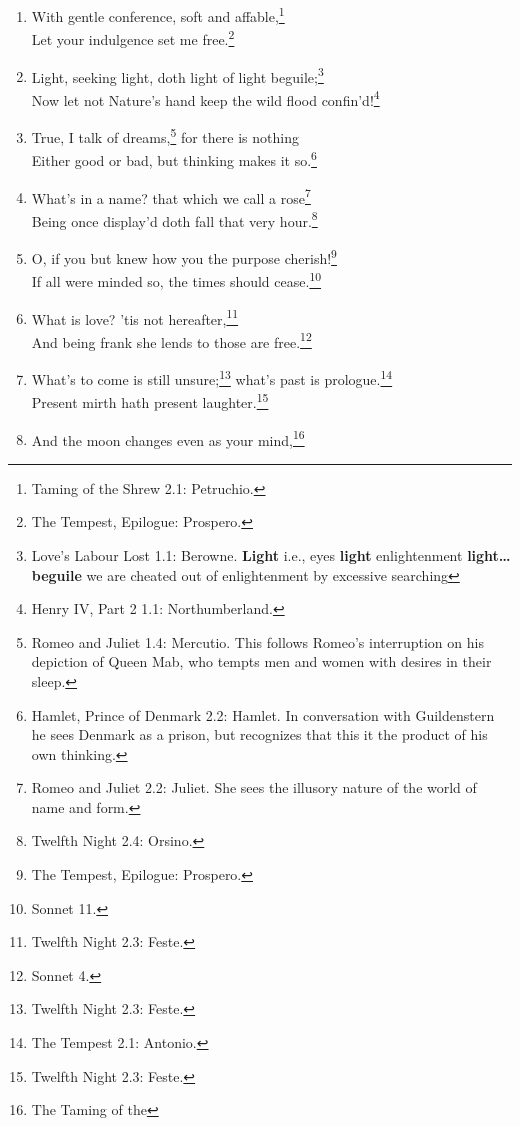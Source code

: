 \documentclass[17pt,twoside]{extarticle}
\begin{document}
\begin{enumerate}
  little moment---\footnote{Sonnet 15.}\\Pray you, tread softly, that
  the blind mole may not hear a foot fall.\footnote{The Tempest 4.1:
    Caliban.}
\item
  With gentle conference, soft and affable,\footnote{Taming of the Shrew
    2.1: Petruchio.}\\Let your indulgence set me free.\footnote{The
    Tempest, Epilogue: Prospero.}
\item
  Light, seeking light, doth light of light beguile;\footnote{Love's
    Labour Lost 1.1: Berowne. \textbf{Light} i.e., eyes \textbf{light}
    enlightenment \textbf{light\ldots{}beguile} we are cheated out of
    enlightenment by excessive searching}\\Now let not Nature's hand
  keep the wild flood confin'd!\footnote{Henry IV, Part 2 1.1:
    Northumberland.}
\item
  True, I talk of dreams,\footnote{Romeo and Juliet 1.4: Mercutio. This
    follows Romeo's interruption on his depiction of Queen Mab, who
    tempts men and women with desires in their sleep.} for there is
  nothing\\Either good or bad, but thinking makes it so.\footnote{Hamlet,
    Prince of Denmark 2.2: Hamlet. In conversation with Guildenstern he
    sees Denmark as a prison, but recognizes that this it the product of
    his own thinking.}
\item
  What's in a name? that which we call a rose\footnote{Romeo and Juliet
    2.2: Juliet. She sees the illusory nature of the world of name and
    form.}\\Being once display'd doth fall that very hour.\footnote{Twelfth
    Night 2.4: Orsino.}
\item
  O, if you but knew how you the purpose cherish!\footnote{The Tempest,
    Epilogue: Prospero.}\\If all were minded so, the times should
  cease.\footnote{Sonnet 11.}
\item
  What is love? 'tis not hereafter,\footnote{Twelfth Night 2.3: Feste.}\\And
  being frank she lends to those are free.\footnote{Sonnet 4.}
\item
  What's to come is still unsure;\footnote{Twelfth Night 2.3: Feste.}
  what's past is prologue.\footnote{The Tempest 2.1: Antonio.}\\Present
  mirth hath present laughter.\footnote{Twelfth Night 2.3: Feste.}
\item
  And the moon changes even as your mind,\footnote{The Taming of the
}
\end{enumerate}
\end{document}
